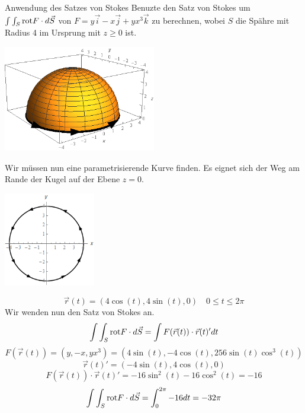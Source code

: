 \begin{Beispiel}{Anwendung des Satzes von Stokes}
    Benuzte den Satz von Stokes um $\int\int_S \text{rot} F \cdot d\vec{S}$ von $F=y\vec{i}-x\vec{j}+yx^3\vec{k}$ zu berechnen, wobei $S$ die Spähre mit Radius 4 im Ursprung mit $z\geq 0$ ist.
          \begin{center}
    \includegraphics[width=0.5\textwidth]{Dateien/Stokes1.png}
\end{center}
Wir müssen nun eine parametrisierende Kurve finden. Es eignet sich der Weg am Rande der Kugel auf der Ebene $z=0.$
          \begin{center}
    \includegraphics[width=0.3\textwidth]{Dateien/Stokes2.png}
    \end{center}
    $$\vec{r}(t)=(4\cos(t), 4\sin(t), 0) \quad 0\leq t \leq 2\pi$$
    Wir wenden nun den Satz von Stokes an.
    $$\int\int_S \text{rot} F\cdot d\vec{S}=\int F(\vec{r}(t))\cdot\vec{r}(t)'dt $$
    $$F(\vec{r}(t))=(y, -x, yx^3)=(4\sin(t),-4\cos(t), 256\sin(t)\cos^3(t))$$
    $$\vec{r}(t)'=(-4\sin(t), 4\cos(t),0)$$
    $$F(\vec{r}(t))\cdot \vec{r}(t)'=-16\sin^2(t)-16\cos^2(t)=-16$$
    $$\int\int_S \text{rot} F\cdot d\vec{S}=\int_0^{2\pi} -16dt = -32\pi$$
\end{Beispiel}